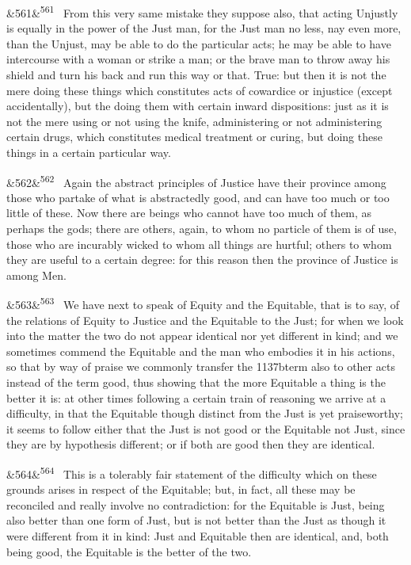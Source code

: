 \documentclass[12pt]{article}
\newcommand{\para}[1][]{\par\noindent\ifx&#1&\else\textsuperscript{\footnotesize #1}~\fi}
\begin{document}
\para[561] From this very same mistake they suppose also, that acting Unjustly is equally in the power of the Just man, for the Just man no less, nay even more, than the Unjust, may be able to do the particular acts; he may be able to have intercourse with a woman or strike a man; or the brave man to throw away his shield and turn his back and run this way or that. True: but then it is not the mere doing these things which constitutes acts of cowardice or injustice (except accidentally), but the doing them with certain inward dispositions: just as it is not the mere using or not using the knife, administering or not administering certain drugs, which constitutes medical treatment or curing, but doing these things in a certain particular way.

\para[562] Again the abstract principles of Justice have their province among those who partake of what is abstractedly good, and can have too much or too little of these. Now there are beings who cannot have too much of them, as perhaps the gods; there are others, again, to whom no particle of them is of use, those who are incurably wicked to whom all things are hurtful; others to whom they are useful to a certain degree: for this reason then the province of Justice is among Men.

\para[563] We have next to speak of Equity and the Equitable, that is to say, of the relations of Equity to Justice and the Equitable to the Just; for when we look into the matter the two do not appear identical nor yet different in kind; and we sometimes commend the Equitable and the man who embodies it in his actions, so that by way of praise we commonly transfer the 1137bterm also to other acts instead of the term good, thus showing that the more Equitable a thing is the better it is: at other times following a certain train of reasoning we arrive at a difficulty, in that the Equitable though distinct from the Just is yet praiseworthy; it seems to follow either that the Just is not good or the Equitable not Just, since they are by hypothesis different; or if both are good then they are identical.

\para[564] This is a tolerably fair statement of the difficulty which on these grounds arises in respect of the Equitable; but, in fact, all these may be reconciled and really involve no contradiction: for the Equitable is Just, being also better than one form of Just, but is not better than the Just as though it were different from it in kind: Just and Equitable then are identical, and, both being good, the Equitable is the better of the two.
\end{document}
